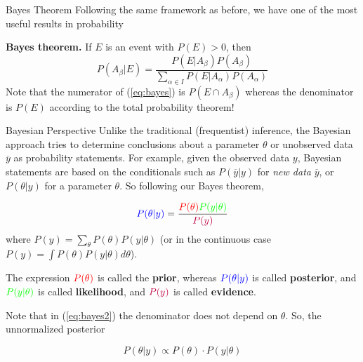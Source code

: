 \documentclass{beamer}
\begin{document}
\begin{frame}{Bayes Theorem}
	Following the same framework as before, we have one of the most useful results in probability
	
	{\bf Bayes theorem.} If $E$ is an event with $P(E)>0$, then
	\begin{equation}
		P(A_\beta |E )= \frac{P(E|A_\beta)P(A_\beta)}{\sum_{\alpha\in I}^{}P(E|A_\alpha)P(A_\alpha)}
		\label{eq:bayes}
	\end{equation}
Note that the numerator of (\ref{eq:bayes}) is $P(E \cap A_\beta)$ whereas the denominator is $P(E)$ according to the total probability theorem!
\end{frame}

\begin{frame}{Bayesian Perspective}
	Unlike the traditional (frequentist) inference, the Bayesian approach tries to determine conclusions about a parameter $\theta$ or unobserved data $\overline{y}$ as probability statements.  For example, given the observed data $y$,  Bayesian statements are based on the conditionals such as  $P(\overline{y}|y)$ for {\it new data} $\overline{y}$, or $P(\theta|y)$ for a parameter $\theta$. So following our Bayes theorem,
	
	\begin{equation}
		{\color{blue}P(\theta| y)}=\frac{{\color{red} P(\theta)} {\color{green}P(y|\theta)}}{\color{purple}P(y)}
		\label{eq:bayes2}
	\end{equation}
where $P(y)= \sum_{\theta} P(\theta) P(y|\theta)$ (or in the continuous case $P(y)= \int P(\theta) P(y|\theta) d\theta$). 

The expression  $\color{red} P(\theta)$ is called the {\bf prior}, whereas  $\color{blue} P(\theta|y)$  is called {\bf posterior}, and $\color{green}P(y|\theta)$ is called {\bf likelihood}, and $\color{purple}P(y)$ is called {\bf evidence}. 

Note that in (\ref{eq:bayes2}) the denominator does not depend on $\theta$.  So, the unnormalized posterior 

\begin{equation*}
	P(\theta|y) \propto P(\theta) \cdot P(y|\theta)
\end{equation*}

 
\end{frame}
\end{document}
